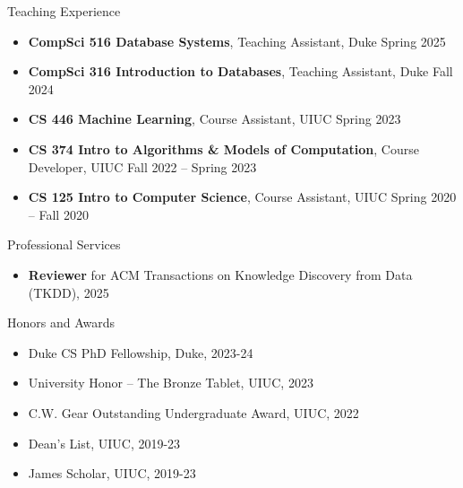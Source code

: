 \documentclass[hidelinks]{resume} %
\begin{document}
\vspace{-5pt}
\begin{rSection}{T\MakeLowercase{eaching} E\MakeLowercase{xperience}}

\begin{itemize}
\itemsep -7pt {}
  \item \textbf{CompSci 516 Database Systems}, Teaching Assistant, Duke \hfill Spring 2025
  \item \textbf{CompSci 316 Introduction to Databases}, Teaching Assistant, Duke \hfill Fall 2024
  \item \textbf{CS 446 Machine Learning}, Course Assistant, UIUC \hfill Spring 2023
  \item \textbf{CS 374 Intro to Algorithms \& Models of Computation}, Course Developer, UIUC \hfill Fall 2022 -- Spring 2023
  \item \textbf{CS 125 Intro to Computer Science}, Course Assistant, UIUC \hfill Spring 2020 -- Fall 2020
\end{itemize}

\end{rSection} 





\vspace{-5pt}
\begin{rSection}{P\MakeLowercase{rofessional} S\MakeLowercase{ervices}}

\begin{itemize}
  \item \textbf{Reviewer} for ACM Transactions on Knowledge Discovery from Data (TKDD), 2025
\end{itemize}
\end{rSection} 

\vspace{-5pt}
\begin{rSection}{H\MakeLowercase{onors and} A\MakeLowercase{wards}}

\begin{itemize}
\itemsep -7pt {}
  \item Duke CS PhD Fellowship, Duke, 2023-24
  \item University Honor -- The Bronze Tablet, UIUC, 2023
  \item C.W. Gear Outstanding Undergraduate Award, UIUC, 2022
  \item Dean’s List, UIUC, 2019-23
  \item James Scholar, UIUC, 2019-23
\end{itemize}
\end{rSection} 
\end{document}
